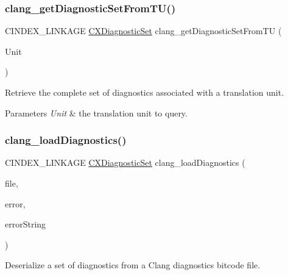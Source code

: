 \subsubsection{\texorpdfstring{clang\+\_\+get\+Diagnostic\+Set\+From\+T\+U()}{clang\_getDiagnosticSetFromTU()}}
{\footnotesize\ttfamily C\+I\+N\+D\+E\+X\+\_\+\+L\+I\+N\+K\+A\+GE \hyperlink{group__CINDEX__DIAG_ga38dfc0ae45b55bf7fd577eed9148e244}{C\+X\+Diagnostic\+Set} clang\+\_\+get\+Diagnostic\+Set\+From\+TU (\begin{DoxyParamCaption}\item[{\hyperlink{group__CINDEX_gacdb7815736ca709ce9a5e1ec2b7e16ac}{C\+X\+Translation\+Unit}}]{Unit }\end{DoxyParamCaption})}



Retrieve the complete set of diagnostics associated with a translation unit. 


\begin{DoxyParams}{Parameters}
{\em Unit} & the translation unit to query. \\
\hline
\end{DoxyParams}
\mbox{\label{group__CINDEX__DIAG_gaa1e3aff15dc2eb97330533f0c68bd28f}} 
\subsubsection{\texorpdfstring{clang\+\_\+load\+Diagnostics()}{clang\_loadDiagnostics()}}
{\footnotesize\ttfamily C\+I\+N\+D\+E\+X\+\_\+\+L\+I\+N\+K\+A\+GE \hyperlink{group__CINDEX__DIAG_ga38dfc0ae45b55bf7fd577eed9148e244}{C\+X\+Diagnostic\+Set} clang\+\_\+load\+Diagnostics (\begin{DoxyParamCaption}\item[{const char $\ast$}]{file,  }\item[{enum \hyperlink{group__CINDEX__DIAG_gafccf4d49329805ac24e6dc005aafc848}{C\+X\+Load\+Diag\+\_\+\+Error} $\ast$}]{error,  }\item[{\hyperlink{structCXString}{C\+X\+String} $\ast$}]{error\+String }\end{DoxyParamCaption})}



Deserialize a set of diagnostics from a Clang diagnostics bitcode file. 


